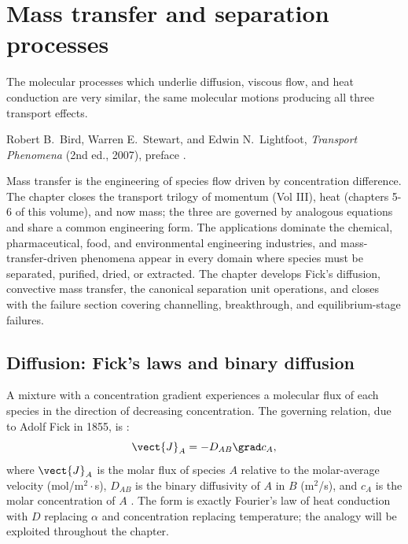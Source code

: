 \chapter{Mass transfer and separation processes}
\label{vol04:ch07}

\epigraph{The molecular processes which underlie diffusion, viscous
flow, and heat conduction are very similar, the same molecular motions
producing all three transport effects.}{Robert B.\ Bird, Warren E.\
Stewart, and Edwin N.\ Lightfoot, \emph{Transport Phenomena} (2nd
ed., 2007), preface
\cite[p.~xv]{text:bird-transport-phenomena}.}


\noindent
Mass transfer is the engineering of species flow driven by
concentration difference. The chapter closes the transport trilogy
of momentum (Vol III), heat (chapters 5-6 of this volume), and now
mass; the three are governed by analogous equations and share a
common engineering form. The applications dominate the chemical,
pharmaceutical, food, and environmental engineering industries, and
mass-transfer-driven phenomena appear in every domain where species
must be separated, purified, dried, or extracted. The chapter
develops Fick's diffusion, convective mass transfer, the canonical
separation unit operations, and closes with the failure section
covering channelling, breakthrough, and equilibrium-stage failures.

\section{Diffusion: Fick's laws and binary diffusion}

A mixture with a concentration gradient experiences a molecular flux
of each species in the direction of decreasing concentration. The
governing relation, due to Adolf Fick in 1855, is
:
\[
\vect{J}_A = -D_{AB} \grad c_A,
\]
where $\vect{J}_A$ is the molar flux of species $A$ relative to the
molar-average velocity (mol/m$^2\cdot$s), $D_{AB}$ is the binary
diffusivity of $A$ in $B$ (m$^2$/s), and $c_A$ is the molar
concentration of $A$ \cite{text:bird-transport-phenomena}. The form
is exactly Fourier's law of heat conduction with $D$ replacing
$\alpha$ and concentration replacing temperature; the analogy will
be exploited throughout the chapter.

